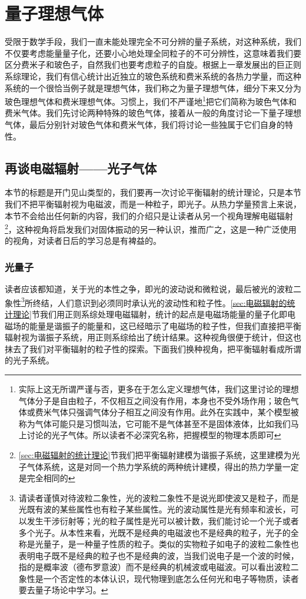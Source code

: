 \documentclass[../../main.tex]{subfiles}
\begin{document}
\chapter{量子理想气体}

受限于数学手段，我们一直未能处理完全不可分辨的量子系统，对这种系统，我们不仅要考虑能量量子化，还要小心地处理全同粒子的不可分辨性，这意味着我们要区分费米子和玻色子，自然我们也要考虑粒子的自旋。根据上一章发展出的巨正则系综理论，我们有信心统计出近独立的玻色系统和费米系统的各热力学量，而这种系统的一个很恰当例子就是理想气体，我们称之为量子理想气体，细分下来又分为玻色理想气体和费米理想气体。习惯上，我们不严谨地\footnote{实际上这无所谓严谨与否，更多在于怎么定义理想气体，我们这里讨论的理想气体分子是自由粒子，不仅相互之间没有作用，本身也不受外场作用；玻色气体或费米气体只强调气体分子相互之间没有作用。此外在实践中，某个模型被称为气体可能只是习惯叫法，它可能不是气体甚至不是固体液体，比如我们马上讨论的光子气体。所以读者不必深究名称，把握模型的物理本质即可}把它们简称为玻色气体和费米气体。我们先讨论两种特殊的玻色气体，接着从一般的角度讨论一下量子理想气体，最后分别针对玻色气体和费米气体，我们将讨论一些独属于它们自身的特性。

\section{再谈电磁辐射——光子气体}\label{sec:光子气体}

本节的标题是开门见山类型的，我们要再一次讨论平衡辐射的统计理论，只是本节我们不把平衡辐射视为电磁波，而是一种粒子，即光子。从热力学量预言上来说，本节不会给出任何新的内容，我们的介绍只是让读者从另一个视角理解电磁辐射\footnote{\ref{sec:电磁辐射的统计理论}节我们把平衡辐射建模为谐振子系统，这里建模为光子气体系统，这是对同一个热力学系统的两种统计建模，得出的热力学量一定是完全相同的}，这种视角将启发我们对固体振动的另一种认识，推而广之，这是一种广泛使用的视角，对读者日后的学习总是有裨益的。

\subsection{光量子}
读者应该都知道，关于光的本性之争，即光的波动说和微粒说，最后被光的波粒二象性\footnote{请读者谨慎对待波粒二象性，光的波粒二象性不是说光即使波又是粒子，而是光既有波的某些属性也有粒子某些属性。光的波动属性是光有频率和波长，可以发生干涉衍射等；光的粒子属性是光可以被计数，我们能讨论一个光子或者多个光子。从本性来看，光既不是经典的电磁波也不是经典的粒子，光子的全称是光量子，是一种量子性质的粒子。类似的实物粒子如电子的波粒二象性也表明电子既不是经典的粒子也不是经典的波，当我们说电子是一个波的时候，指的是概率波（德布罗意波）而不是经典的机械波或电磁波。可以看出波粒二象性是一个否定性的本体认识，现代物理到底怎么任何光和电子等物质，读者要去量子场论中学习。}所终结，人们意识到必须同时承认光的波动性和粒子性。\ref{sec:电磁辐射的统计理论}节我们用正则系综处理电磁辐射，统计的起点是电磁场能量的量子化即电磁场的能量是谐振子的能量和，这已经暗示了电磁场的粒子性，但我们直接把平衡辐射视为谐振子系统，用正则系综给出了统计结果。这种视角很便于统计，但这也抹去了我们对平衡辐射的粒子性的探索。下面我们换种视角，把平衡辐射看成所谓的光子系统。
\end{document}
